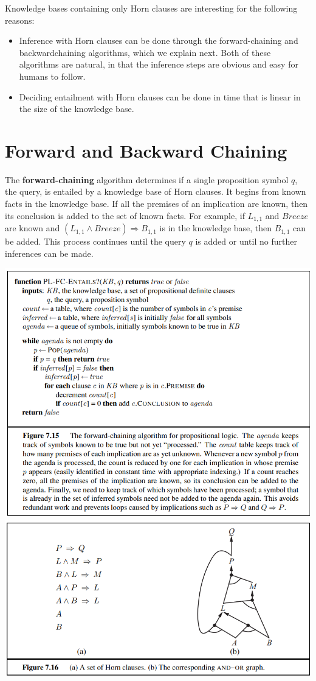 Knowledge bases containing only Horn clauses are interesting for the following reasons:
\begin{itemize}
    \item  Inference with Horn clauses can be done through the forward-chaining and backwardchaining algorithms, which we explain next. Both of these algorithms are natural, in that the inference steps are obvious and easy for humans to follow.

    \item  Deciding entailment with Horn clauses can be done in time that is linear in the size of the knowledge base.
\end{itemize}

\section{Forward and Backward Chaining}
The \textbf{forward-chaining} algorithm  determines if a single proposition symbol $q$, the query, is entailed by a knowledge base of Horn clauses. It begins from known facts in the knowledge base. If all the premises of an implication are known, then its conclusion is added to the set of known facts. For example, if $L_{1,1}$ and $Breeze$ are known and $(L_{1,1} \land Breeze) \Rightarrow B_{1,1}$ is in the knowledge base, then $B_{1,1}$ can be added. This process continues until the query $q$ is added or until no further inferences can be made.
\begin{center}
    \includegraphics[]{images/forward chaining.png}
    \includegraphics[]{images/graph.png}
\end{center}
